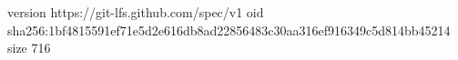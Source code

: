 version https://git-lfs.github.com/spec/v1
oid sha256:1bf4815591ef71e5d2e616db8ad22856483c30aa316ef916349c5d814bb45214
size 716
